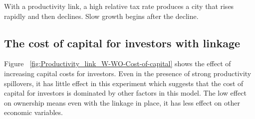 
With a productivity link, a high relative tax rate produces a city that rises rapidly and then declines. Slow growth begins after the decline.





\newpage
\subsection{The cost of capital for investors  with linkage}
Figure ~\ref{fig:Productivity_link_W-WO-Cost-of-capital} %
shows the effect of increasing capital costs for investors. Even in the presence of strong productivity spillovers, it has little effect in this experiment which suggests that the cost of capital for investors is dominated by other factors in this model. The low effect on ownership means even with the linkage in place, it has less effect on other economic variables. 

